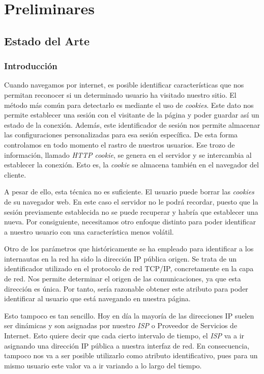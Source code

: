 \chapter{Preliminares}
\section{Estado del Arte}
\subsection{Introducción}
Cuando navegamos por internet, es posible identificar características que nos permitan reconocer si un determinado usuario ha visitado nuestro sitio. El método más común para detectarlo es mediante el uso de \textit{cookies}. Este dato nos permite establecer una sesión con el visitante de la página y poder guardar así un estado de la conexión. Además, este identificador de sesión nos permite almacenar las configuraciones personalizadas para esa sesión específica. De esta forma controlamos en todo momento el rastro de nuestros usuarios. Ese trozo de información, llamado \textit{HTTP cookie}\cite{rfc6265}, se genera en el servidor y se intercambia al establecer la conexión. Esto es, la \textit{cookie} se almacena también en el navegador del cliente. \par

A pesar de ello, esta técnica no es suficiente. El usuario puede borrar las \textit{cookies} de su navegador web. En este caso el servidor no le podrá recordar, puesto que la sesión previamente establecida no se puede recuperar y habría que establecer una nueva. Por consiguiente, necesitamos otro enfoque distinto para poder identificar a nuestro usuario con una característica menos volátil. \par

Otro de los parámetros que históricamente se ha empleado para identificar a los internautas en la red ha sido la dirección IP pública origen. Se trata de un identificador utilizado en el protocolo de red TCP/IP, concretamente en la capa de red. Nos permite determinar el origen de las comunicaciones, ya que esta dirección es única. Por tanto, sería razonable obtener este atributo para poder identificar al usuario que está navegando en nuestra página. \par

Esto tampoco es tan sencillo. Hoy en día la mayoría de las direcciones IP suelen ser dinámicas y son asignadas por nuestro \textit{ISP} o Proveedor de Servicios de Internet. Esto quiere decir que cada cierto intervalo de tiempo, el \textit{ISP} va a ir asignando una dirección IP pública a nuestra interfaz de red. En consecuencia, tampoco nos va a ser posible utilizarlo como atributo identificativo, pues para un mismo usuario este valor va a ir variando a lo largo del tiempo. \par

